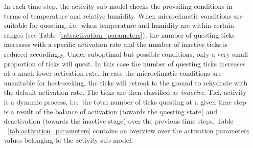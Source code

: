 \documentclass[a4paper, 11pt]{scrartcl}
\begin{document}
In each time step, the activity sub model checks the prevailing conditions in terms of temperature and relative humidity. When microclimatic conditions are suitable for questing, i.e.\ when temperature and humidity are within certain ranges (see Table~\ref{tab:activation_parameters}), the number of questing ticks increases with a specific activation rate and the number of inactive ticks is reduced accordingly. Under suboptimal but possible conditions, only a very small proportion of ticks will quest. In this case the number of questing ticks increases at a much lower activation rate. In case the microclimatic conditions are unsuitable for host-seeking, the ticks will retreat to the ground to rehydrate with the default activation rate. The ticks are then classified as \emph{inactive}. Tick activity is a dynamic process, i.e.\ the total number of ticks questing at a given time step is a result of the balance of activation (towards the questing state) and deactivation (towards the inactive stage) over the previous time steps. Table ~\ref{tab:activation_parameters} contains an overview over the activation parameters values belonging to the activity sub model.
\end{document}
